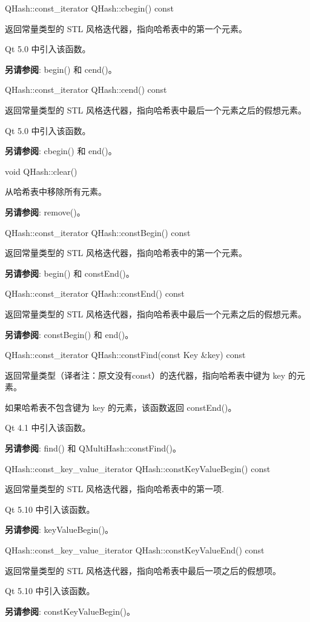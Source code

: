 QHash::const\_iterator QHash::cbegin() const

返回常量类型的 STL 风格迭代器，指向哈希表中的第一个元素。

Qt 5.0 中引入该函数。

\textbf{另请参阅}: begin() 和 cend()。

QHash::const\_iterator QHash::cend() const

返回常量类型的 STL 风格迭代器，指向哈希表中最后一个元素之后的假想元素。

Qt 5.0 中引入该函数。

\textbf{另请参阅}: cbegin() 和 end()。

void QHash::clear()

从哈希表中移除所有元素。

\textbf{另请参阅}: remove()。

QHash::const\_iterator QHash::constBegin() const

返回常量类型的 STL 风格迭代器，指向哈希表中的第一个元素。

\textbf{另请参阅}: begin() 和 constEnd()。

QHash::const\_iterator QHash::constEnd() const

返回常量类型的 STL 风格迭代器，指向哈希表中最后一个元素之后的假想元素。

\textbf{另请参阅}: constBegin() 和 end()。

QHash::const\_iterator QHash::constFind(const Key \&key) const

返回常量类型（译者注：原文没有const）的迭代器，指向哈希表中键为 key 的元素。

如果哈希表不包含键为 key 的元素，该函数返回 constEnd()。

Qt 4.1 中引入该函数。

\textbf{另请参阅}: find() 和 QMultiHash::constFind()。

QHash::const\_key\_value\_iterator QHash::constKeyValueBegin() const

返回常量类型的 STL 风格迭代器，指向哈希表中的第一项.

Qt 5.10 中引入该函数。

\textbf{另请参阅}: keyValueBegin()。

QHash::const\_key\_value\_iterator QHash::constKeyValueEnd() const

返回常量类型的 STL 风格迭代器，指向哈希表中最后一项之后的假想项。

Qt 5.10 中引入该函数。

\textbf{另请参阅}: constKeyValueBegin()。

